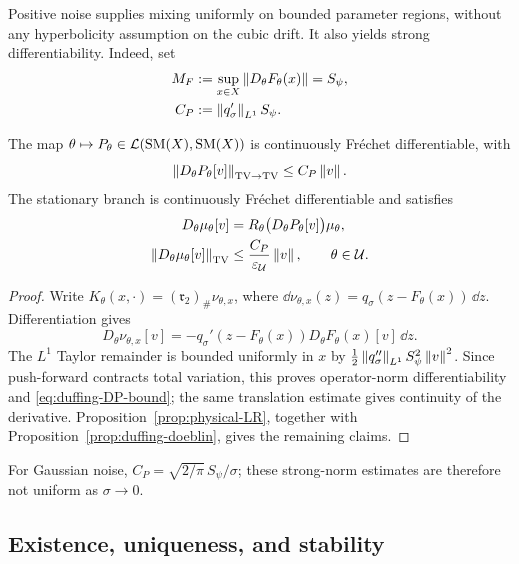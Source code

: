 Positive noise supplies mixing uniformly on bounded parameter regions,
without any hyperbolicity assumption on the cubic drift. It also yields
strong differentiability. Indeed, set
\begin{align}
  M_F&:=\sup_{x\in X}\left\lVert D_\theta F_\theta(x)\right\rVert=S_\psi,
  \label{eq:duffing-MF}\\
  C_P&:=\left\lVert q_\sigma'\right\rVert_{L^1}S_\psi.
  \label{eq:duffing-CP}
\end{align}

\begin{proposition}
\label{prop:duffing-P-differentiability}
The map $\theta\mapsto P_\theta\in\mathcal L(\mathrm{SM}(X),\mathrm{SM}(X))$
is continuously Fr\'echet differentiable, with
\begin{equation}
  \left\lVert D_\theta P_\theta[v]\right\rVert_{\rm TV\to TV}\le C_P\left\lVert v\right\rVert.
  \label{eq:duffing-DP-bound}
\end{equation}
The stationary branch is continuously Fr\'echet differentiable and satisfies
\begin{align}
  D_\theta\mu_\theta[v]
    &=R_\theta\bigl(D_\theta P_\theta[v]\bigr)\mu_\theta,
  \label{eq:duffing-LR}\\
  \left\lVert D_\theta\mu_\theta[v]\right\rVert_{\rm TV}
    &\le\frac{C_P}{\varepsilon_{\mathcal U}}\left\lVert v\right\rVert,
    \qquad \theta\in\mathcal U.
  \label{eq:duffing-Dmu-bound}
\end{align}
\end{proposition}

\begin{proof}
Write $K_\theta(x,\cdot)=(\mathfrak r_2)_\#\nu_{\theta,x}$, where
$\dd\nu_{\theta,x}(z)=q_\sigma(z-F_\theta(x))\,\dd z$. Differentiation gives
\[
  D_\theta\nu_{\theta,x}[v]
  =-q_\sigma'(z-F_\theta(x))D_\theta F_\theta(x)[v]\,\dd z.
\]
The $L^1$ Taylor remainder is bounded uniformly in $x$ by
$\frac12\left\lVert q_\sigma''\right\rVert_{L^1}S_\psi^2\left\lVert v\right\rVert^2$.
Since push-forward contracts total variation, this proves operator-norm
differentiability and \eqref{eq:duffing-DP-bound}; the same translation
estimate gives continuity of the derivative. Proposition~\ref{prop:physical-LR},
together with Proposition~\ref{prop:duffing-doeblin}, gives the remaining claims.
\end{proof}

For Gaussian noise, $C_P=\sqrt{2/\pi}\,S_\psi/\sigma$; these strong-norm
estimates are therefore not uniform as $\sigma\to0$.

\subsection{Existence, uniqueness, and stability}

